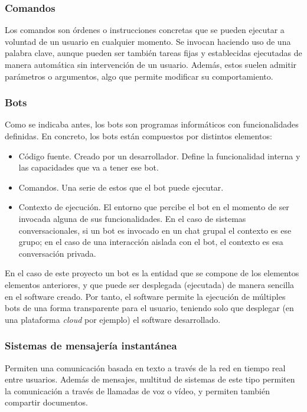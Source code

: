 \subsubsection{Comandos}

Los comandos son órdenes o instrucciones concretas que se pueden ejecutar a voluntad de un usuario en cualquier momento. Se invocan haciendo uso de una palabra clave, aunque pueden ser también tareas fijas y establecidas ejecutadas de manera automática sin intervención de un usuario. Además, estos suelen admitir parámetros o argumentos, algo que permite modificar su comportamiento.

\subsubsection{Bots}

Como se indicaba antes, los bots son programas informáticos con funcionalidades definidas. En concreto, los bots están compuestos por distintos elementos:

\begin{itemize}
	\item Código fuente. Creado por un desarrollador. Define la funcionalidad interna y las capacidades que va a tener ese bot.
	\item Comandos. Una serie de estos que el bot puede ejecutar.
	\item Contexto de ejecución. El entorno que percibe el bot en el momento de ser invocada alguna de sus funcionalidades. En el caso de sistemas conversacionales, si un bot es invocado en un chat grupal el contexto es ese grupo; en el caso de una interacción aislada con el bot, el contexto es esa conversación privada.
\end{itemize}

En el caso de este proyecto un bot es la entidad que se compone de los elementos elementos anteriores, y que puede ser desplegada (ejecutada) de manera sencilla en el software creado. Por tanto, el software permite la ejecución de múltiples bots de una forma transparente para el usuario, teniendo solo que desplegar (en una plataforma \textit{cloud} por ejemplo) el software desarrollado.

\subsubsection{Sistemas de mensajería instantánea}

Permiten una comunicación basada en texto a través de la red en tiempo real entre usuarios. Además de mensajes, multitud de sistemas de este tipo permiten la comunicación a través de llamadas de voz o vídeo, y permiten también compartir documentos.

